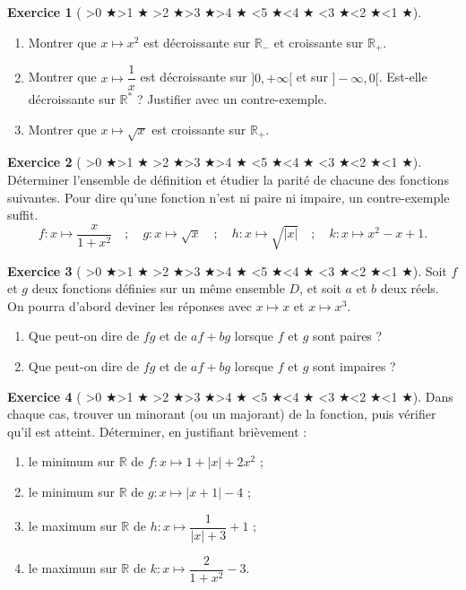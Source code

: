 \documentclass[12pt,a4paper]{article}
\newcommand{\diff}[1]{%
  \textcolor{orange!80!black}{\ifnum#1>0 $\bigstar$\fi\ifnum#1>1 $\bigstar$\fi
  \ifnum#1>2 $\bigstar$\fi\ifnum#1>3 $\bigstar$\fi\ifnum#1>4 $\bigstar$\fi}%
  \textcolor{gray!40}{\ifnum#1<5 $\bigstar$\fi\ifnum#1<4 $\bigstar$\fi
  \ifnum#1<3 $\bigstar$\fi\ifnum#1<2 $\bigstar$\fi\ifnum#1<1 $\bigstar$\fi}}
\theoremstyle{plain}
\theoremstyle{definition}
\newtheorem{exercise}{Exercice}
\theoremstyle{remark}
\begin{document}
\begin{exercise}[\diff{3}]
\begin{enumerate}[label=\alph*)]
  \item Montrer que $x \mapsto x^2$ est décroissante sur $\mathbb{R}_-$ et croissante
  sur $\mathbb{R}_+$.
  \item Montrer que $x \mapsto \dfrac{1}{x}$ est décroissante sur $]0, +\infty[$ et sur
  $]-\infty, 0[$. Est-elle décroissante sur $\mathbb{R}^*$ ? Justifier avec 
  un contre-exemple.
  \item Montrer que $x \mapsto \sqrt{x}$ est croissante sur $\mathbb{R}_+$.
\end{enumerate}
\label{ex:variations_reference}
\end{exercise}

\begin{exercise}[\diff{2}]
Déterminer l'ensemble de définition et étudier la parité de chacune des fonctions
suivantes. Pour dire qu'une fonction n'est ni paire ni impaire, un contre-exemple
suffit.
\[
  f : x \mapsto \frac{x}{1 + x^2} \quad ; \quad g : x \mapsto \sqrt{x} \quad ;
  \quad h : x \mapsto \sqrt{\lvert x \rvert} \quad ; \quad k : x \mapsto x^2 - x + 1.
\]
\label{ex:def_parity}
\end{exercise}

\begin{exercise}[\diff{2}]
Soit $f$ et $g$ deux fonctions définies sur un même ensemble $D$, et soit $a$ et $b$
deux réels. On pourra d'abord deviner les réponses avec $x \mapsto x$ et
$x \mapsto x^3$.
\begin{enumerate}[label=\alph*)]
  \item Que peut-on dire de $fg$ et de $af + bg$ lorsque $f$ et $g$ sont paires ?
  \item Que peut-on dire de $fg$ et de $af + bg$ lorsque $f$ et $g$ sont impaires ?
\end{enumerate}
\label{ex:parity_operations}
\end{exercise}

\begin{exercise}[\diff{3}]
Dans chaque cas, trouver un minorant (ou un majorant) de la fonction, puis vérifier
qu'il est atteint. Déterminer, en justifiant brièvement :
\begin{enumerate}[label=\alph*)]
  \item le minimum sur $\mathbb{R}$ de $f : x \mapsto 1 + \lvert x \rvert + 2x^2$ ;
  \item le minimum sur $\mathbb{R}$ de $g : x \mapsto \lvert x + 1 \rvert - 4$ ;
  \item le maximum sur $\mathbb{R}$ de $h : x \mapsto \dfrac{1}{\lvert x \rvert + 3} + 1$ ;
  \item le maximum sur $\mathbb{R}$ de $k : x \mapsto \dfrac{2}{1 + x^2} - 3$.
\end{enumerate}
\label{ex:extrema}
\end{exercise}
\end{document}
